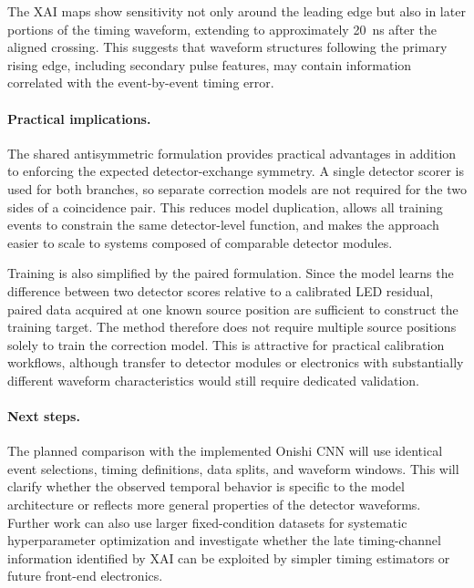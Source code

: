 The XAI maps show sensitivity not only around the leading edge but also in later portions of the timing waveform, extending to approximately 
\SI{20}{ns} after the aligned crossing. 
This suggests that waveform structures following the primary rising edge, including secondary pulse features, may contain information correlated 
with the event-by-event timing error.

\paragraph{Practical implications.}
The shared antisymmetric formulation provides practical advantages in addition to enforcing the expected detector-exchange symmetry. 
A single detector scorer is used for both branches, so separate correction models are not required for the two sides of a coincidence pair. 
This reduces model duplication, allows all training events to constrain the same detector-level function, and makes the approach easier to scale 
to systems composed of comparable detector modules.

Training is also simplified by the paired formulation. Since the model learns the difference between two detector scores relative to a calibrated 
LED residual, paired data acquired at one known source position are sufficient to construct the training target. The method therefore does not require 
multiple source positions solely to train the correction model. This is attractive for practical calibration workflows, although transfer to detector 
modules or electronics with substantially different waveform characteristics would still require dedicated validation.

\paragraph{Next steps.}
The planned comparison with the implemented Onishi CNN will use identical event selections, timing definitions, data splits, and waveform windows. 
This will clarify whether the observed temporal behavior is specific to the model architecture or reflects more general properties of the 
detector waveforms. Further work can also use larger fixed-condition datasets for systematic hyperparameter optimization and investigate whether the 
late timing-channel information identified by XAI can be exploited by simpler timing estimators or future front-end electronics.
